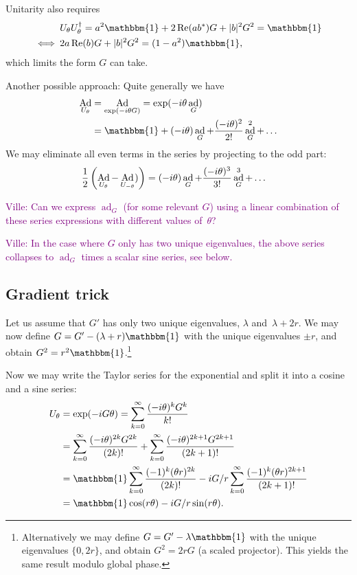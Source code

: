 \documentclass[aps,pra,10pt,twocolumn,groupedaddress,nofootinbib]{revtex4-1}
\theoremstyle{plain}
\DeclareMathOperator{\re}{Re}
\DeclareMathOperator{\Ad}{Ad}
\DeclareMathOperator{\ad}{ad}
\newcommand{\I}{\mathbbm{1}} %
\newcommand{\ville}[1]{\textcolor{purple}{Ville: #1}}
\begin{document}
Unitarity also requires
\begin{align}
\notag
&U_\theta U_\theta^\dagger = a^2\I +2\re(ab^*) G +|b|^2 G^2 = \I\\
\iff \:&
2a\re(b) G +|b|^2 G^2 = (1-a^2)\I,
\end{align}
which limits the form $G$ can take.

Another possible approach:
Quite generally we have
\begin{align}
\notag
\Ad_{U_\theta}
&= \Ad_{\exp(-i \theta G)}
= \exp(-i \theta \ad_{G})\\
&= \I +(-i\theta)\ad_G +\frac{(-i\theta)^2}{2!} \ad_G^2 +\ldots
\end{align}
We may eliminate all even terms in the series by projecting to the odd part:
\begin{align}
\notag
\frac{1}{2}\left(\Ad_{U_\theta} -\Ad_{U_{-\theta}})\right)
&= (-i\theta)\ad_G +\frac{(-i\theta)^3}{3!} \ad_G^3 +\ldots
\end{align}


\ville{Can we express $\ad_G$ (for some relevant $G$) using a linear combination of these series expressions with different values of~$\theta$?}

\ville{In the case where $G$ only has two unique eigenvalues, the above series collapses to $\ad_G$ times a scalar sine series, see below.}

\subsection{Gradient trick}
\label{sec:gradient_trick}

Let us assume that $G'$ has only two unique eigenvalues, $\lambda$ and~$\lambda+2r$.
We may now define $G = G' -(\lambda+r)\I$ with the unique eigenvalues
$\pm r$, and obtain $G^2 = r^2\I$.\footnote{
Alternatively we may define $G = G' -\lambda \I$ with the unique eigenvalues
$\{0, 2r\}$, and obtain $G^2 = 2r G$ (a scaled projector).
This yields the same result modulo global phase.}


Now we may write the Taylor series for the exponential
and split it into a cosine and a sine series:
\begin{align*}
U_\theta &= \exp(-iG\theta) = \sum_{k=0}^\infty \frac{(-i\theta)^k G^k}{k!}\\
&=
\sum_{k=0}^\infty \frac{(-i\theta)^{2k} G^{2k}}{(2k)!}
+\sum_{k=0}^\infty \frac{(-i\theta)^{2k+1} G^{2k+1}}{(2k+1)!}\\
&=
\I \sum_{k=0}^\infty \frac{(-1)^{k} (\theta r)^{2k}}{(2k)!}
-i G/r \sum_{k=0}^\infty \frac{(-1)^{k} (\theta r)^{2k+1}}{(2k+1)!}\\
&=
\I \cos(r \theta)
-i G/r \sin(r \theta).
\end{align*}
\end{document}
